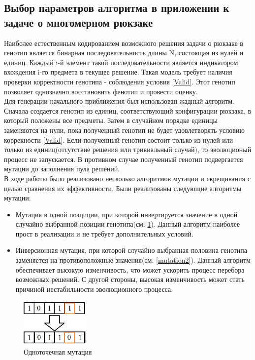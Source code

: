 \subsection{Выбор параметров алгоритма в приложении к\\ задаче о многомерном рюкзаке}
Наиболее естественным кодированием возможного решения задачи о рюкзаке в генотип является бинарная последовательность длины N, состоящая из нулей и единиц.
Каждый i-й элемент такой последовательности является индикатором вхождения i-го предмета в текущее решение. Такая модель требует наличия проверки корректности генотипа - соблюдения условия \ref{Valid}. Этот генотип позволяет однозначно восстановить фенотип и провести оценку.
\\ Для генерации начального приближения был использован жадный алгоритм. Сначала создается генотип из единиц, соответствующий конфигурации рюкзака, в который положены все предметы. Затем в случайном порядке единицы заменяются на нули, пока полученный генотип не будет удовлетворять условию коррекности \ref{Valid}. Если полученный генотип состоит только из нулей или только из единиц(отсутствие решения или тривиальный случай), то эволюционый процесс не запускается. 
В противном случае полученный генотип подвергается мутации до заполнения пула решений.
\\ В ходе работы было реализовано несколько алгоритмов мутации и скрещивания с целью сравнения их эффективности. Были реализованы следующие алгоритмы мутации:
\begin{itemize}
	\item Мутация в одной позциции, при которой инвертируется значение в одной случайно выбранной позиции генотипа(см. \ref{mutation1}). Данный алгоритм наиболее прост в реализации и не требует дополнительных условий.
	\item Инверсионная мутация, при которой случайно выбранная половина генотипа заменяется на противоположные значения(см. \ref{mutation2}). Данный алгоритм обеспечивает высокую изменчивость, что может ускорить процесс перебора возможных решений. С другой стороны, высокая изменчивость может стать причиной нестабильности эволюционного процесса. 
\end{itemize}
\FloatBarrier
	\begin{figure}[htbp]	
	\includegraphics[width=0.3\textwidth]{./Pics/1.jpg}
	\caption{Одноточечная мутация}
	\label{mutation1}
	\end{figure}	

